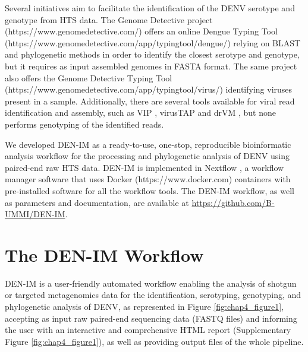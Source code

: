 Several initiatives aim to facilitate the identification of the DENV serotype and genotype from HTS data. The Genome Detective project (https://www.genomedetective.com/) offers an online Dengue Typing Tool (https://www.genomedetective.com/app/typingtool/dengue/) \citep{fonseca_computational_2019} relying on BLAST and phylogenetic methods in order to identify the closest serotype and genotype, but it requires as input assembled genomes in FASTA format. The same project also offers the Genome Detective Typing Tool (https://www.genomedetective.com/app/typingtool/virus/) \citep{vilsker_genome_2019} identifying viruses present in a sample. Additionally, there are several tools available for viral read identification and assembly, such as VIP \citep{li_vip_2016}, virusTAP \citep{yamashita_virustap_2016} and drVM \citep{lin_drvm_2017}, but none performs genotyping of the identified reads.

We developed DEN-IM as a ready-to-use, one-stop, reproducible bioinformatic analysis workflow for the processing and phylogenetic analysis of DENV using paired-end raw HTS data. DEN-IM is implemented in Nextflow \citep{di_tommaso_nextflow_2017}, a workflow manager software that uses Docker (https://www.docker.com) containers with pre-installed software for all the workflow tools. The DEN-IM workflow, as well as parameters and documentation, are available at \url{https://github.com/B-UMMI/DEN-IM}.

\section{The DEN-IM Workflow}

DEN-IM is a user-friendly automated workflow enabling the analysis of shotgun or targeted metagenomics data for the identification, serotyping, genotyping, and phylogenetic analysis of DENV, as represented in Figure \ref{fig:chap4_figure1}, accepting as input raw paired-end sequencing data (FASTQ files) and informing the user with an interactive and comprehensive HTML report (Supplementary Figure \ref{fig:chap4_figure1}), as well as providing output files of the whole pipeline. 

